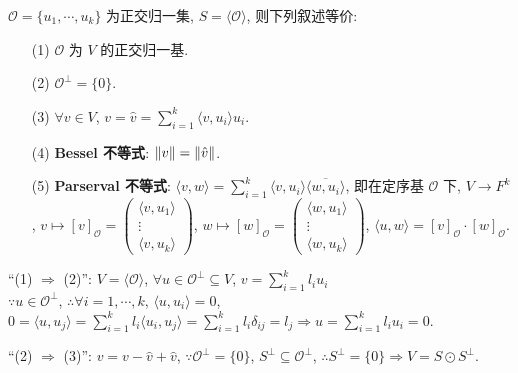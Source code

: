 \documentclass{note}
\begin{document}
\begin{thm}
    $\mathcal{O}=\{u_1,\cdots,u_k\}$ 为正交归一集, $S=\langle\mathcal{O}\rangle$, 则下列叙述等价:
    \begin{itemize}
        \item[(1)] $\mathcal{O}$ 为 $V$ 的正交归一基.
        \item[(2)] $\mathcal{O}^{\perp}=\{0\}$.
        \item[(3)] $\forall v\in V$, $v=\hat{v}=\sum_{i=1}^k\langle v,u_i\rangle u_i$.
        \item[(4)] \textbf{Bessel 不等式}: $\left\lVert v\right\rVert=\left\lVert\hat{v}\right\rVert$.
        \item[(5)] \textbf{Parserval 不等式}: $\langle v,w\rangle=\sum_{i=1}^k\langle v,u_i\rangle\overline{\langle w,u_i\rangle}$, 即在定序基 $\mathcal{O}$ 下, $V\rightarrow F^k$, $v\mapsto[v]_{\mathcal{O}}=\begin{pmatrix}
            \langle v,u_1\rangle\\
            \vdots\\
            \langle v,u_k\rangle
        \end{pmatrix}$, $w\mapsto[w]_{\mathcal{O}}=\begin{pmatrix}
            \langle w,u_1\rangle\\
            \vdots\\
            \langle w,u_k\rangle
        \end{pmatrix}$, $\langle u,w\rangle=[v]_{\mathcal{O}}\cdot[w]_{\mathcal{O}}$.
    \end{itemize}
\end{thm}
\begin{pf}
    ``(1) $\Longrightarrow$ (2)'': $V=\langle\mathcal{O}\rangle$, $\forall u\in\mathcal{O}^{\perp}\subseteq V$, $v=\sum_{i=1}^kl_iu_i$\\
    $\because u\in\mathcal{O}^{\perp}$, $\therefore\forall i=1,\cdots,k$, $\langle u,u_i\rangle=0$,\\
    $0=\langle u,u_j\rangle=\sum_{i=1}^kl_i\langle u_i,u_j\rangle=\sum_{i=1}^kl_i\delta_{ij}=l_j\Longrightarrow u=\sum_{i=1}^kl_iu_i=0$.

    ``(2) $\Longrightarrow$ (3)'': $v=v-\hat{v}+\hat{v}$, $\because\mathcal{O}^{\perp}=\{0\}$, $S^{\perp}\subseteq\mathcal{O}^{\perp}$, $\therefore S^{\perp}=\{0\}\Longrightarrow V=S\odot S^{\perp}$.
\end{pf}
\end{document}
